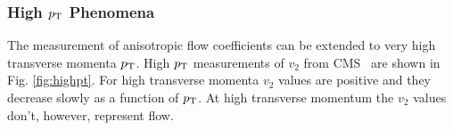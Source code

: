 \FloatBarrier

\subsubsection{High $p_{\rm T}$ Phenomena}
The measurement of anisotropic flow coefficients can be extended to very high transverse momenta $p_{\rm T}$. High $p_{\rm T}$ measurements of $v_2$ from CMS~\cite{Chatrchyan:2012xq} are shown in Fig. \ref{fig:highpt}. For high transverse momenta $v_2$ values are positive and they decrease slowly as a function of $p_{\rm T}$. At high transverse momentum the $v_2$ values don't, however, represent flow. 

\FloatBarrier
%
%
%
